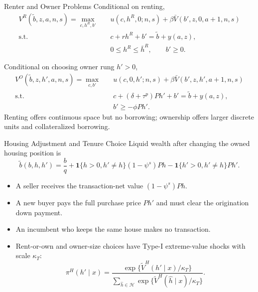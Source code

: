 \documentclass[aspectratio=169,11pt]{beamer}
\newcommand{\tightitems}{\setlength{\itemsep}{0.55em}}
\newcommand{\1}{\mathbf 1}
\begin{document}
\begin{frame}{Renter and Owner Problems}
  \small
  Conditional on renting,
  \[
  \begin{aligned}
    V^R(\tilde b,z,a,n,s)=\max_{c,h^R,b'}\quad
      &u(c,h^R,0;n,s)+\beta\bar V(b',z,0,a+1,n,s)\\
    \text{s.t.}\quad
      &c+r h^R+b'=\tilde b+y(a,z),\\
      &0\le h^R\le\bar h^R,\qquad b'\ge0.
  \end{aligned}
  \]

  Conditional on choosing owner rung $h'>0$,
  \[
  \begin{aligned}
    V^O(\tilde b,z,h',a,n,s)=\max_{c,b'}\quad
      &u(c,0,h';n,s)+\beta\bar V(b',z,h',a+1,n,s)\\
    \text{s.t.}\quad
      &c+(\delta+\tau^p)Ph'+b'=\tilde b+y(a,z),\\
      &b'\ge-\phi Ph'.
  \end{aligned}
  \]
  Renting offers continuous space but no borrowing; ownership offers larger discrete units and collateralized borrowing.
\end{frame}

\begin{frame}{Housing Adjustment and Tenure Choice}
  Liquid wealth after changing the owned housing position is
  \[
    \tilde b(b,h,h')
    =\frac{b}{q}
    +\1\{h>0,h'\neq h\}(1-\psi^s)Ph
    -\1\{h'>0,h'\neq h\}Ph'.
  \]

  \begin{itemize}\tightitems
    \item A seller receives the transaction-net value $(1-\psi^s)Ph$.
    \item A new buyer pays the full purchase price $Ph'$ and must clear the origination down payment.
    \item An incumbent who keeps the same house makes no transaction.
    \item Rent-or-own and owner-size choices have Type-I extreme-value shocks with scale $\kappa_T$:
    \[
      \pi^H(h'\mid x)
      =\frac{\exp\{\widetilde V^H(h'\mid x)/\kappa_T\}}
      {\sum_{\hat h\in\mathcal H}\exp\{\widetilde V^H(\hat h\mid x)/\kappa_T\}}.
    \]
  \end{itemize}
\end{frame}
\end{document}

